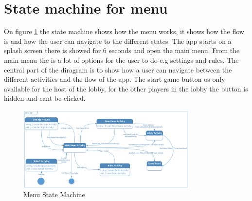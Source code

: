 \section{State machine for menu}

On figure \ref{StateMachine} the state machine shows how the menu works, it shows how the flow is and how the user can navigate to the different states. The app starts on a splash screen there is showed for 6 seconds and open the main menu. From the main menu the is a lot of options for the user to do e.g settings and rules. The central part of the diragram is to show how a user can navigate between the different activities and the flow of the app. The start game button os only available for the host of the lobby, for the other players in the lobby the button is hidden and cant be clicked.

\begin{figure}
	\centering
	\includegraphics[width=0.8\textwidth]{images/Menu_State_Machine.png}
	\caption{Menu State Machine \label{StateMachine}}
\end{figure}